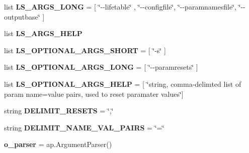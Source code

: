 \begin{DoxyCompactItemize}
\item 
list {\bfseries L\+S\+\_\+\+A\+R\+G\+S\+\_\+\+L\+O\+NG} = \mbox{[} \char`\"{}-\/-\/lifetable\char`\"{} , \char`\"{}-\/-\/configfile\char`\"{}, \char`\"{}-\/-\/paramnamesfile\char`\"{}, \char`\"{}-\/-\/outputbase\char`\"{} \mbox{]}\hypertarget{namespacenegui_1_1pgopsimupop_a8977d448f347ba9c846134a89549b32c}{}\label{namespacenegui_1_1pgopsimupop_a8977d448f347ba9c846134a89549b32c}

\item 
list {\bfseries L\+S\+\_\+\+A\+R\+G\+S\+\_\+\+H\+E\+LP}
\item 
list {\bfseries L\+S\+\_\+\+O\+P\+T\+I\+O\+N\+A\+L\+\_\+\+A\+R\+G\+S\+\_\+\+S\+H\+O\+RT} = \mbox{[} \char`\"{}-\/s\char`\"{} \mbox{]}\hypertarget{namespacenegui_1_1pgopsimupop_a39f067d4c30cb68ba1e224041953ed00}{}\label{namespacenegui_1_1pgopsimupop_a39f067d4c30cb68ba1e224041953ed00}

\item 
list {\bfseries L\+S\+\_\+\+O\+P\+T\+I\+O\+N\+A\+L\+\_\+\+A\+R\+G\+S\+\_\+\+L\+O\+NG} = \mbox{[} \char`\"{}-\/-\/paramresets\char`\"{} \mbox{]}\hypertarget{namespacenegui_1_1pgopsimupop_aa902e08fc9dfcc79d06e214a1e148b56}{}\label{namespacenegui_1_1pgopsimupop_aa902e08fc9dfcc79d06e214a1e148b56}

\item 
list {\bfseries L\+S\+\_\+\+O\+P\+T\+I\+O\+N\+A\+L\+\_\+\+A\+R\+G\+S\+\_\+\+H\+E\+LP} = \mbox{[} \char`\"{}string, comma-\/delimted list of param name=value pairs, used to reset paramater values\char`\"{}\mbox{]}\hypertarget{namespacenegui_1_1pgopsimupop_a0317fe293bd70be108e4bc069a60030b}{}\label{namespacenegui_1_1pgopsimupop_a0317fe293bd70be108e4bc069a60030b}

\item 
string {\bfseries D\+E\+L\+I\+M\+I\+T\+\_\+\+R\+E\+S\+E\+TS} = \char`\"{},\char`\"{}\hypertarget{namespacenegui_1_1pgopsimupop_a23dbd35b63c2d1c7a6dd9f9b6f961a78}{}\label{namespacenegui_1_1pgopsimupop_a23dbd35b63c2d1c7a6dd9f9b6f961a78}

\item 
string {\bfseries D\+E\+L\+I\+M\+I\+T\+\_\+\+N\+A\+M\+E\+\_\+\+V\+A\+L\+\_\+\+P\+A\+I\+RS} = \char`\"{}=\char`\"{}\hypertarget{namespacenegui_1_1pgopsimupop_af014ec17f166b028500785fca623d455}{}\label{namespacenegui_1_1pgopsimupop_af014ec17f166b028500785fca623d455}

\item 
{\bfseries o\+\_\+parser} = ap.\+Argument\+Parser()\hypertarget{namespacenegui_1_1pgopsimupop_a3d8547946e12ab40ad4e3eee5b67d1dd}{}\label{namespacenegui_1_1pgopsimupop_a3d8547946e12ab40ad4e3eee5b67d1dd}


\end{DoxyCompactItemize}

